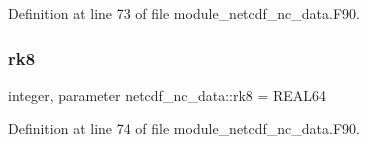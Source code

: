 Definition at line 73 of file module\+\_\+netcdf\+\_\+nc\+\_\+data.\+F90.

\mbox{\label{namespacenetcdf__nc__data_ade82ed46db72e1615dada1c3ead06d51}} 
\subsubsection{\texorpdfstring{rk8}{rk8}}
{\footnotesize\ttfamily integer, parameter netcdf\+\_\+nc\+\_\+data\+::rk8 = R\+E\+A\+L64}



Definition at line 74 of file module\+\_\+netcdf\+\_\+nc\+\_\+data.\+F90.

